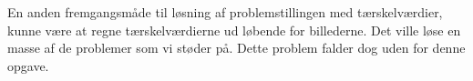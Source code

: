 En anden fremgangsmåde til løsning af problemstillingen med tærskelværdier, kunne
være at regne tærskelværdierne ud løbende for billederne. Det ville
løse en masse af de problemer som vi støder på. Dette problem falder dog 
uden for denne opgave.

